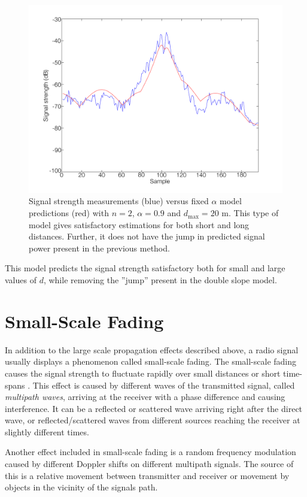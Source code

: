 \documentclass{LTHthesis}
\begin{document}
 \begin{figure}[!hbt]

\includegraphics[width=1\textwidth ]{images/signal_model/fixed_alpha}
\caption{Signal strength measurements (blue) versus fixed $\alpha$ model predictions (red) with $n=2$, $\alpha=0.9$ and $d_{\text{max}}=20$ m. This type of model gives satisfactory estimations for both short and long distances. Further, it does not have the jump in predicted signal power present in the previous method.}\label{fixed_alpha}
\end{figure}

This model predicts the signal strength satisfactory both for small and large values of $d$, while removing the ''jump'' present in the double slope model.
 \section{Small-Scale Fading}
In addition to the large scale propagation effects described above, a radio signal usually displays a phenomenon called small-scale fading. The small-scale fading causes the signal strength to fluctuate rapidly over small distances or short time-spans \cite{rappaport96}. This effect is caused by different waves of the transmitted signal, called \emph{multipath waves}, arriving at the receiver with a phase difference and causing interference. It can be a reflected or scattered wave arriving right after the direct wave, or reflected/scattered waves from different sources reaching the receiver at slightly different times. 

Another effect included in small-scale fading is a random frequency modulation caused by different Doppler shifts on different multipath signals. The source of this is a relative movement between transmitter and receiver or movement by objects in the vicinity of the signals path. 
\end{document}
